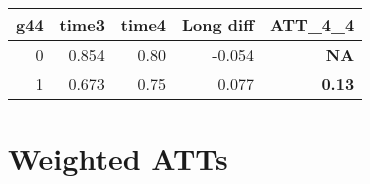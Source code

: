 \documentclass[
]{article}
\begin{document}
\begin{table}
\centering
\begin{tabular}{r|r|r|r|>{}r}
\hline
g44 & time3 & time4 & Long diff & ATT\_4\_4\\
\hline
0 & 0.854 & 0.80 & -0.054 & \textbf{NA}\\
\hline
1 & 0.673 & 0.75 & 0.077 & \textbf{0.13}\\
\hline
\end{tabular}
\end{table}

\hypertarget{weighted-atts}{%
\section{Weighted ATTs}\label{weighted-atts}}
\end{document}
